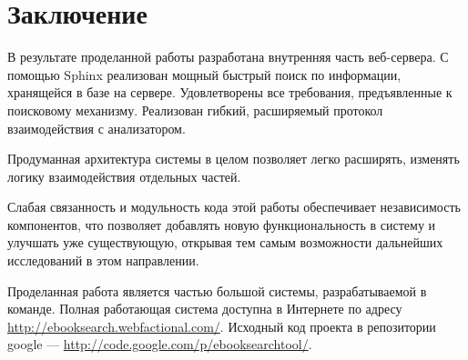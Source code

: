 \section{Заключение}
В результате проделанной работы разработана внутренняя часть веб-сервера.
С помощью Sphinx реализован мощный быстрый поиск по информации, хранящейся в базе на сервере.
Удовлетворены все требования, предъявленные к поисковому механизму.
Реализован гибкий, расширяемый протокол взаимодействия с анализатором.

Продуманная архитектура системы в целом позволяет легко расширять, изменять логику взаимодействия отдельных частей.

Слабая связанность и модульность кода этой работы обеспечивает независимость компонентов, что позволяет добавлять новую функциональность в систему и улучшать уже существующую,
открывая тем самым возможности дальнейших исследований в этом направлении.

Проделанная работа является частью большой системы, разрабатываемой в команде. Полная работающая система доступна в Интернете по адресу\\ \url{http://ebooksearch.webfactional.com/}. Исходный код проекта в репозитории google --- \url{http://code.google.com/p/ebooksearchtool/}.
